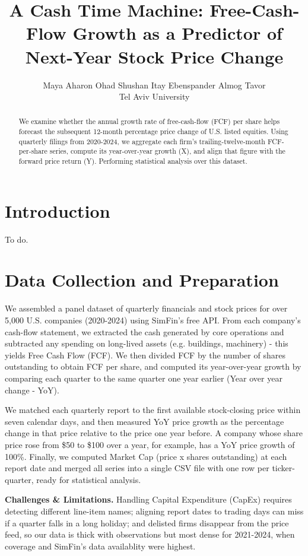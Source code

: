 \documentclass[11pt]{article}
\title{A Cash Time Machine: Free-Cash-Flow Growth as a Predictor of Next-Year Stock Price Change}
\author{Maya Aharon \quad Ohad Shushan \quad Itay Ebenspander \quad Almog Tavor \\
        Tel Aviv University \\}
\begin{document}
\maketitle
\begin{abstract}
We examine whether the annual growth rate of free-cash-flow (FCF) per share helps forecast the subsequent 12-month percentage price change of U.S. listed equities. Using quarterly filings from 2020-2024, we aggregate each firm's trailing-twelve-month FCF-per-share series, compute its year-over-year growth (X), and align that figure with the forward price return (Y). Performing statistical analysis over this dataset.
\end{abstract}

\section{Introduction}

To do.

\section{Data Collection and Preparation}

We assembled a panel dataset of quarterly financials and stock prices for over 5,000 U.S. companies (2020-2024) using SimFin's free API. From each company's cash-flow statement, we extracted the cash generated by core operations and subtracted any spending on long-lived assets (e.g. buildings, machinery) - this yields Free Cash Flow (FCF). We then divided FCF by the number of shares outstanding to obtain FCF per share, and computed its year-over-year growth by comparing each quarter to the same quarter one year earlier (Year over year change - YoY).

We matched each quarterly report to the first available stock-closing price within seven calendar days, and then measured YoY price growth as the percentage change in that price relative to the price one year before. A company whose share price rose from \$50 to \$100 over a year, for example, has a YoY price growth of 100\%. Finally, we computed Market Cap (price x shares outstanding) at each report date and merged all series into a single CSV file with one row per ticker-quarter, ready for statistical analysis.

\textbf{Challenges \& Limitations.}  Handling Capital Expenditure (CapEx) requires detecting different line-item names; aligning report dates to trading days can miss if a quarter falls in a long holiday; and delisted firms disappear from the price feed, so our data is thick with observations but most dense for 2021-2024, when coverage and SimFin's data availablity were highest.  
\end{document}

